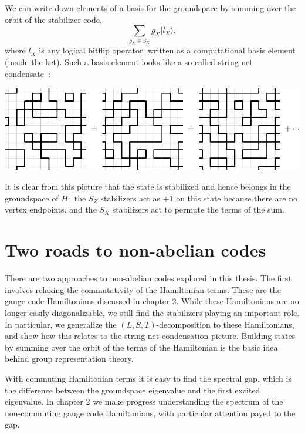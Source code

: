 \documentclass[11pt,oneside]{report}
\newcommand{\ket}[1]{|{#1}\rangle}
\begin{document}
We can write down elements of a basis for the groundspace by summing over
the orbit of the stabilizer code,
$$
    \sum_{g_X\in S_X} g_X \ket{l_X},
$$
where $l_X$ is any logical bitflip operator,
written as a computational basis element (inside the ket).
Such a basis element looks like a so-called string-net condensate\ \cite{Levin2005}:
\begin{center}
\includegraphics[width=0.8\columnwidth]{pic-toric-liquid.pdf}
\end{center}
It is clear from this picture that the state is stabilized and
hence belongs in the groundspace of $H:$ 
the $S_Z$ stabilizers act as $+1$ on this state because there
are no vertex endpoints, and the $S_X$ stabilizers act to permute
the terms of the sum.


\section{Two roads to non-abelian codes}

There are two approaches to non-abelian codes
explored in this thesis.
The first involves relaxing the commutativity
of the Hamiltonian terms.
These are the gauge code Hamiltonians discussed in chapter 2.
While these Hamiltonians are no longer easily diagonalizable,
we still find the stabilizers playing an important role.
In particular, we generalize the $(L,S,T)$-decomposition to these
Hamiltonians, and show how this relates to the string-net condensation picture.
Building states by summing over the orbit of the terms of the
Hamiltonian is the basic idea behind group representation theory.

With commuting Hamiltonian terms it is easy to find the spectral gap,
which is the difference between the groundspace eigenvalue and the
first excited eigenvalue.
In chapter 2 
we make progress understanding the spectrum of
the non-commuting gauge code Hamiltonians, 
with particular attention payed
to the gap.
\end{document}
